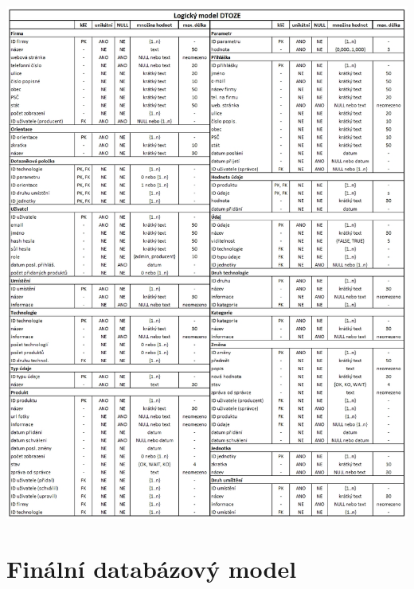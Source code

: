 \documentclass[11pt,a4paper]{article}
\begin{document}
\begin{table}[H] 
\centering  
\includegraphics[scale=0.45]{DTOZE_log_D_final} 
\end{table}

\section{Finální databázový model\label{attach:DTOZE-dt}}
\end{document}
